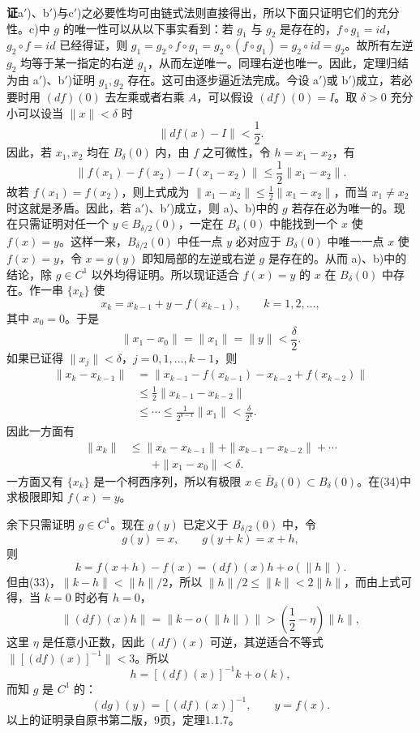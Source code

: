 \noindent\textbf{证}\quad a$'$)、b$'$)与c$'$)之必要性均可由链式法则直接得出，所以下面只证明它们的充分性。c)中 $g$ 的唯一性可以从以下事实看到：若 $g_1$ 与 $g_2$ 是存在的，$f\circ g_1=id$，$g_2\circ f=id$ 已经得证，则 $g_1=g_2\circ f\circ g_1=g_2\circ(f\circ g_1)=g_2\circ id=g_2$。故所有左逆 $g_2$ 均等于某一指定的右逆 $g_1$，从而左逆唯一。同理右逆也唯一。因此，定理归结为由 a$'$)、b$'$)证明 $g_1,g_2$ 存在。这可由逐步逼近法完成。今设 a$'$)或 b$'$)成立，若必要时用 $(df)(0)$ 去左乘或者右乘 $A$，可以假设 $(df)(0)=I$。取 $\delta>0$ 充分小可以设当 $\|x\|<\delta$ 时
\[
 \|df(x)-I\|<\frac12.
\]
因此，若 $x_1,x_2$ 均在 $B_\delta(0)$ 内，由 $f$ 之可微性，令 $h=x_1-x_2$，有
\begin{equation}
 \|f(x_1)-f(x_2)-I(x_1-x_2)\|
 \le\frac12\|x_1-x_2\|.
 \tag{33}
\end{equation}
故若 $f(x_1)=f(x_2)$，则上式成为 $\|x_1-x_2\|\le\frac12\|x_1-x_2\|$，而当 $x_1\ne x_2$ 时这就是矛盾。因此，若 a$'$)、b$'$)成立，则 a)、b)中的 $g$ 若存在必为唯一的。现在只需证明对任一个 $y\in B_{\delta/2}(0)$，一定在 $B_\delta(0)$ 中能找到一个 $x$ 使 $f(x)=y$。这样一来，$B_{\delta/2}(0)$ 中任一点 $y$ 必对应于 $B_\delta(0)$ 中唯一一点 $x$ 使 $f(x)=y$，令 $x=g(y)$ 即知局部的左逆或右逆 $g$ 是存在的。从而 a)、b)中的结论，除 $g\in C^1$ 以外均得证明。所以现证适合 $f(x)=y$ 的 $x$ 在 $B_\delta(0)$ 中存在。作一串 $\{x_k\}$ 使
\begin{equation}
 x_k=x_{k-1}+y-f(x_{k-1}),\qquad k=1,2,\ldots,
 \tag{34}
\end{equation}
其中 $x_0=0$。于是
\[
 \|x_1-x_0\|=\|x_1\|=\|y\|<\frac\delta2.
\]
如果已证得 $\|x_j\|<\delta$，$j=0,1,\ldots,k-1$，则
\[
\begin{aligned}
 \|x_k-x_{k-1}\|
 &=\|x_{k-1}-f(x_{k-1})-x_{k-2}+f(x_{k-2})\|\\
 &\le\frac12\|x_{k-1}-x_{k-2}\|\\
 &\le\cdots\le\frac1{2^{k-1}}\|x_1\|<\frac\delta{2^k}.
\end{aligned}
\]
因此一方面有
\[
\begin{aligned}
 \|x_k\|&\le\|x_k-x_{k-1}\|+\|x_{k-1}-x_{k-2}\|+\cdots\\
 &\qquad+\|x_1-x_0\|<\delta.
\end{aligned}
\]
一方面又有 $\{x_k\}$ 是一个柯西序列，所以有极限 $x\in\overline B_\delta(0)\subset B_\delta(0)$。在(34)中求极限即知 $f(x)=y$。

余下只需证明 $g\in C^1$。现在 $g(y)$ 已定义于 $B_{\delta/2}(0)$ 中，令
\[
 g(y)=x,\qquad g(y+k)=x+h,
\]
则
\[
 k=f(x+h)-f(x)=(df)(x)h+o(\|h\|).
\]
但由(33)，$\|k-h\|<\|h\|/2$，所以 $\|h\|/2\le\|k\|<2\|h\|$，而由上式可得，当 $k=0$ 时必有 $h=0$，
\[
 \|(df)(x)h\|=\|k-o(\|h\|)\|>\left(\frac12-\eta\right)\|h\|,
\]
这里 $\eta$ 是任意小正数，因此 $(df)(x)$ 可逆，其逆适合不等式 $\|[(df)(x)]^{-1}\|<3$。所以
\[
 h=[(df)(x)]^{-1}k+o(k),
\]
而知 $g$ 是 $C^1$ 的：
\[
 (dg)(y)=[(df)(x)]^{-1},\qquad y=f(x).
\]
以上的证明录自原书第二版，9页，定理1.1.7。

